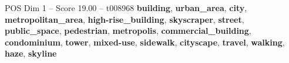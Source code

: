 \begin{textsample}{POS Dim 1 – Score 19.00 – t008968}  \label{ex:f1_pos_026}
\textbf{building}, \textbf{urban\_area}, \textbf{city}, \textbf{metropolitan\_area}, \textbf{high-rise\_building}, \textbf{skyscraper}, \textbf{street}, \textbf{public\_space}, \textbf{pedestrian}, \textbf{metropolis}, \textbf{commercial\_building}, \textbf{condominium}, \textbf{tower}, \textbf{mixed-use}, \textbf{sidewalk}, \textbf{cityscape}, \textbf{travel}, \textbf{walking}, \textbf{haze}, \textbf{skyline}

\end{textsample}
